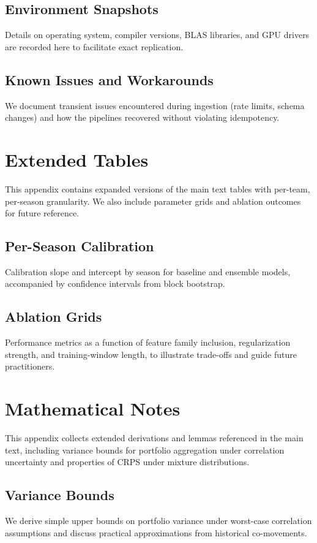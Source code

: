 \documentclass[12pt]{report}  %
\numberwithin{equation}{section}
\theoremstyle{plain}
\theoremstyle{definition}
\theoremstyle{remark}
\begin{document}
\section{Environment Snapshots}
Details on operating system, compiler versions, BLAS libraries, and GPU drivers are recorded here to facilitate exact replication.

\section{Known Issues and Workarounds}
We document transient issues encountered during ingestion (rate limits, schema changes) and how the pipelines recovered without violating idempotency.

\chapter{Extended Tables}
This appendix contains expanded versions of the main text tables with per-team, per-season granularity. We also include parameter grids and ablation outcomes for future reference.

\section{Per-Season Calibration}
Calibration slope and intercept by season for baseline and ensemble models, accompanied by confidence intervals from block bootstrap.

\section{Ablation Grids}
Performance metrics as a function of feature family inclusion, regularization strength, and training-window length, to illustrate trade-offs and guide future practitioners.

\chapter{Mathematical Notes}
This appendix collects extended derivations and lemmas referenced in the main text, including variance bounds for portfolio aggregation under correlation uncertainty and properties of CRPS under mixture distributions.

\section{Variance Bounds}
We derive simple upper bounds on portfolio variance under worst-case correlation assumptions and discuss practical approximations from historical co-movements.
\end{document}
